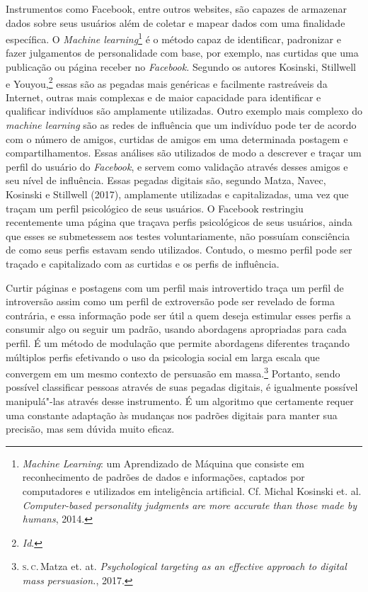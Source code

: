 Instrumentos como Facebook, entre outros websites, são capazes de
armazenar dados sobre seus usuários além de coletar e mapear dados com
uma finalidade específica. O \textit{Machine learning}\footnote{\textit{Machine
  Learning}: um Aprendizado de Máquina que consiste em reconhecimento
  de padrões de dados e informações, captados por computadores e
  utilizados em inteligência artificial. Cf. Michal Kosinski et. al. \textit{Computer-based
personality judgments are more accurate than those made by
humans}, 2014.} é o método capaz de identificar, padronizar e fazer julgamentos
de personalidade com base, por exemplo, nas curtidas que uma publicação
ou página receber no \textit{Facebook.} Segundo os autores
Kosinski, Stillwell e Youyou,\footnote{\textit{Id}.} essas são as pegadas mais genéricas
e facilmente rastreáveis da Internet, outras mais complexas e de maior
capacidade para identificar e qualificar indivíduos são amplamente
utilizadas. Outro exemplo mais complexo do \textit{machine learning} são
as redes de influência que um indivíduo pode ter de acordo com o número
de amigos, curtidas de amigos em uma determinada postagem e
compartilhamentos. Essas análises são utilizados de modo a descrever
e traçar um perfil do usuário do \textit{Facebook}, e servem como
validação através desses amigos e seu nível de influência. Essas pegadas
digitais são, segundo Matza, Navec, Kosinski e Stillwell (2017),
amplamente utilizadas e capitalizadas, uma vez que traçam um perfil
psicológico de seus usuários. O Facebook restringiu recentemente uma
página que traçava perfis psicológicos de seus usuários, ainda que esses
se submetessem aos testes voluntariamente, não possuíam consciência de
como seus perfis estavam sendo utilizados. Contudo, o mesmo perfil pode
ser traçado e capitalizado com as curtidas e os perfis de influência.

Curtir páginas e postagens com um perfil mais introvertido traça um
perfil de introversão assim como um perfil de extroversão pode ser
revelado de forma contrária, e essa informação pode ser útil a quem
deseja estimular esses perfis a consumir algo ou seguir um padrão,
usando abordagens apropriadas para cada perfil. É um método de modulação
que permite abordagens diferentes traçando múltiplos perfis efetivando o
uso da psicologia social em larga escala que convergem em um mesmo
contexto de persuasão em massa.\footnote{\textsc{s.\,c.}\,Matza et. at. \textit{Psychological targeting as an effective approach to digital mass persuasion.}, 2017.}
Portanto, sendo possível classificar pessoas através de suas pegadas
digitais, é igualmente possível manipulá"-las através desse instrumento.
É um algoritmo que certamente requer uma constante adaptação às mudanças
nos padrões digitais para manter sua precisão, mas sem dúvida muito
eficaz.

